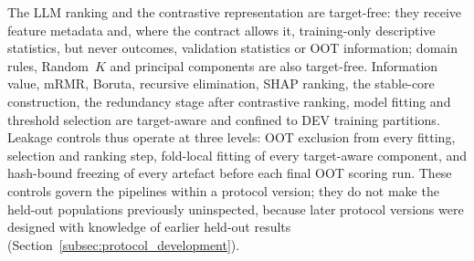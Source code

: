 \documentclass[final,5p,twocolumn]{elsarticle}
\newcommand{\Kfeat}{K}
\begin{document}
The LLM ranking and the contrastive representation are target-free: they receive feature metadata and, where the contract allows it, training-only descriptive statistics, but never outcomes, validation statistics or OOT information; domain rules, Random~$\Kfeat$ and principal components are also target-free. Information value, mRMR, Boruta, recursive elimination, SHAP ranking, the stable-core construction, the redundancy stage after contrastive ranking, model fitting and threshold selection are target-aware and confined to DEV training partitions. Leakage controls thus operate at three levels: OOT exclusion from every fitting, selection and ranking step, fold-local fitting of every target-aware component, and hash-bound freezing of every artefact before each final OOT scoring run. These controls govern the pipelines within a protocol version; they do not make the held-out populations previously uninspected, because later protocol versions were designed with knowledge of earlier held-out results (Section~\ref{subsec:protocol_development}).
\end{document}
